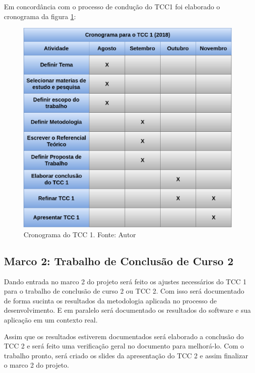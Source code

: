 Em concordância com o processo de condução do TCC1 foi elaborado o cronograma da figura \ref{fig:cronograma_tcc1}:

\begin{figure}[!ht]
	\centering
  \includegraphics[keepaspectratio=true,scale=0.4]{figuras/cronograma_tcc1.eps}
  \caption[Cronograma do TCC 1.]{Cronograma do TCC 1. Fonte: Autor}
	\label{fig:cronograma_tcc1}
\end{figure}

\subsection{Marco 2: Trabalho de Conclusão de Curso 2}

Dando entrada no marco 2 do projeto será feito os ajustes necessários do TCC 1 para o trabalho de conclusão de curso 2 ou TCC 2. Com isso será documentado de forma sucinta os resultados da metodologia aplicada no processo de desenvolvimento. E em paralelo será documentado os resultados do software e sua aplicação em um contexto real.

Assim que os resultados estiverem documentados será elaborado a conclusão do TCC 2 e será feito uma verificação geral no documento para melhorá-lo. Com o trabalho pronto, será criado os slides da apresentação do TCC 2 e assim finalizar o marco 2 do projeto.

